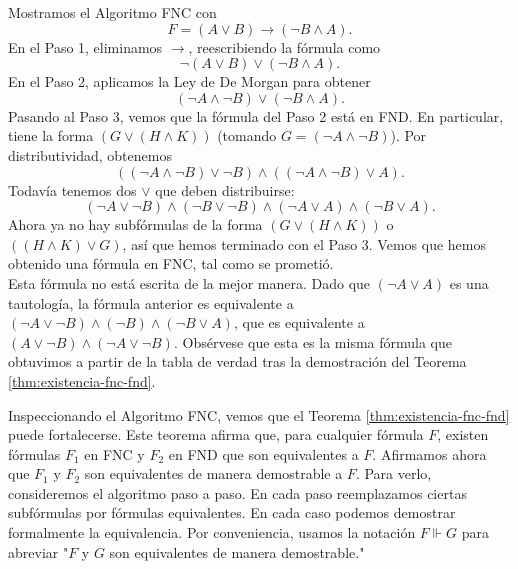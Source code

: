 \message{ !name(main.tex)}\documentclass[12pt,a4paper]{book}
\newcommand{\comillas}[1]{"#1"}
\begin{document}
    \begin{ejemplo}\label{ej:algoritmo-fnc}
        Mostramos el Algoritmo FNC con
        \begin{equation*}
            F=(A\vee B)\rightarrow(\neg B\wedge A).
        \end{equation*}
        En el Paso 1, eliminamos $\rightarrow$, reescribiendo la fórmula como
        \begin{equation*}
            \neg(A\vee B)\vee(\neg B\wedge A).
        \end{equation*}
        En el Paso 2, aplicamos la Ley de De Morgan para obtener
        \begin{equation*}
            (\neg A\wedge\neg B)\vee(\neg B\wedge A).
        \end{equation*}
        Pasando al Paso 3, vemos que la fórmula del Paso 2 está en FND. En particular, tiene la forma $(G\vee(H\wedge K))$
        (tomando $G=(\neg A\wedge\neg B)$). Por distributividad, obtenemos
        \begin{equation*}
            ((\neg A\wedge\neg B)\vee\neg B)\wedge((\neg A\wedge\neg B)\vee A).
        \end{equation*}
        Todavía tenemos dos $\vee$ que deben distribuirse:
        \begin{equation*}
            (\neg A\vee\neg B)\wedge(\neg B\vee\neg B)\wedge(\neg A\vee A)\wedge(\neg B\vee A).
        \end{equation*}
        Ahora ya no hay subfórmulas de la forma $(G\vee(H\wedge K))$ o $((H\wedge K)\vee G)$, así que hemos terminado con el
        Paso 3. Vemos que hemos obtenido una fórmula en FNC, tal como se prometió.\\
        Esta fórmula no está escrita de la mejor manera. Dado que $(\neg A\vee A)$ es una tautología, la fórmula anterior es
        equivalente a $(\neg A\vee\neg B)\wedge(\neg B)\wedge(\neg B\vee A)$, que es equivalente a
        $(A\vee\neg B)\wedge(\neg A\vee\neg B)$. Obsérvese que esta es la misma fórmula que obtuvimos a partir de la tabla de
        verdad tras la demostración del Teorema \ref{thm:existencia-fnc-fnd}.
    \end{ejemplo}

    Inspeccionando el Algoritmo FNC, vemos que el Teorema \ref{thm:existencia-fnc-fnd} puede fortalecerse. Este teorema
    afirma que, para cualquier fórmula $F$, existen fórmulas $F_{1}$ en FNC y $F_{2}$ en FND que son equivalentes a $F$.
    Afirmamos ahora que $F_{1}$ y $F_{2}$ son equivalentes de manera demostrable a $F$. Para verlo, consideremos el algoritmo
    paso a paso. En cada paso reemplazamos ciertas subfórmulas por fórmulas equivalentes. En cada caso podemos demostrar
    formalmente la equivalencia. Por conveniencia, usamos la notación $F\Vdash G$ para abreviar \comillas{$F$ y $G$
    son equivalentes de manera demostrable.}
\end{document}
